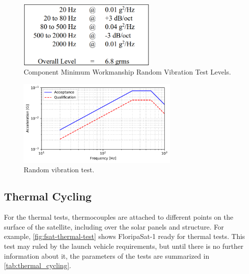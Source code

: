 \begin{figure}[!htb]
    \begin{center}
        \includegraphics[width=0.6\textwidth]{figures/random-vibration.png}
        \caption{Component Minimum Workmanship Random Vibration Test Levels.}
        \label{tab:vibration-random}
    \end{center}
\end{figure}


\begin{figure}[!htb]
    \begin{center}
        \includegraphics[width=0.7\textwidth]{curves/random_vibration.pdf}
        \caption{Random vibration test.}
        \label{fig:vibration-random}
    \end{center}
\end{figure}

\subsection{Thermal Cycling}

For the thermal tests, thermocouples are attached to different points on the surface of the satellite, including over the solar panels and structure. For example, \autoref{fig:fsat-thermal-test} shows FloripaSat-1 ready for thermal tests. This test may ruled by the launch vehicle requirements, but until there is no further information about it, the parameters of the tests are summarized in \autoref{tab:thermal_cycling}.

